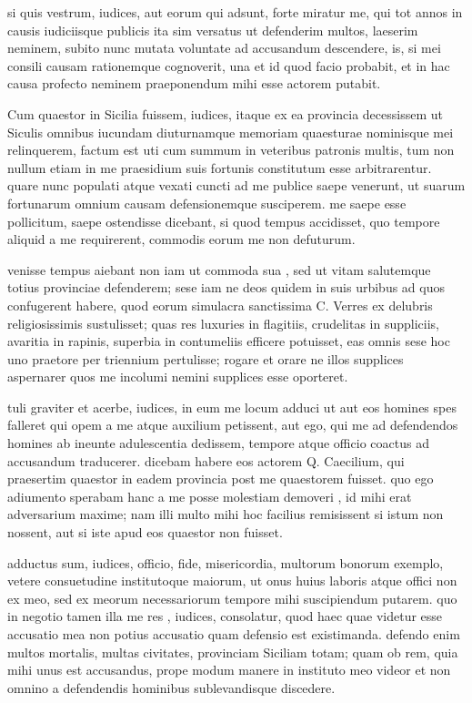
 si quis vestrum, iudices, aut eorum qui adsunt, forte miratur me, qui tot annos in causis iudiciisque publicis ita sim versatus ut defenderim multos, laeserim neminem, subito nunc mutata voluntate ad accusandum descendere, is, si mei consili causam rationemque cognoverit, una et id quod facio probabit, et in hac causa profecto neminem praeponendum mihi esse actorem putabit.

 Cum quaestor in Sicilia fuissem, iudices, itaque ex ea provincia decessissem ut Siculis omnibus iucundam diuturnamque memoriam quaesturae nominisque mei relinquerem, factum est uti cum summum in veteribus patronis multis, tum non nullum etiam in me praesidium suis fortunis constitutum esse arbitrarentur. quare nunc populati atque vexati cuncti ad me publice saepe venerunt, ut suarum fortunarum omnium causam defensionemque susciperem. me saepe esse pollicitum, saepe ostendisse dicebant, si quod tempus accidisset, quo tempore aliquid a me requirerent, commodis eorum me non defuturum.

 venisse tempus aiebant non iam ut commoda sua , sed ut vitam salutemque totius provinciae defenderem; sese iam ne deos quidem in suis urbibus ad quos confugerent habere, quod eorum simulacra sanctissima C. Verres ex delubris religiosissimis sustulisset; quas res luxuries in flagitiis, crudelitas in suppliciis, avaritia in rapinis, superbia in contumeliis efficere potuisset, eas omnis sese hoc uno praetore per triennium pertulisse; rogare et orare ne illos supplices aspernarer quos me incolumi nemini supplices esse oporteret.

 tuli graviter et acerbe, iudices, in eum me locum adduci ut aut eos homines spes falleret qui opem a me atque auxilium petissent, aut ego, qui me ad defendendos homines ab ineunte adulescentia dedissem, tempore atque officio coactus ad accusandum traducerer. dicebam habere eos actorem Q. Caecilium, qui praesertim quaestor in eadem provincia post me quaestorem fuisset. quo ego adiumento sperabam hanc a me posse molestiam demoveri , id mihi erat adversarium maxime; nam illi multo mihi hoc facilius remisissent si istum non nossent, aut si iste apud eos quaestor non fuisset.

 adductus sum, iudices, officio, fide, misericordia, multorum bonorum exemplo, vetere consuetudine institutoque maiorum, ut onus huius laboris atque offici non ex meo, sed ex meorum necessariorum tempore mihi suscipiendum putarem. quo in negotio tamen illa me res , iudices, consolatur, quod haec quae videtur esse accusatio mea non potius accusatio quam defensio est existimanda. defendo enim multos mortalis, multas civitates, provinciam Siciliam totam; quam ob rem, quia mihi unus est accusandus, prope modum manere in instituto meo videor et non omnino a defendendis hominibus sublevandisque discedere.

